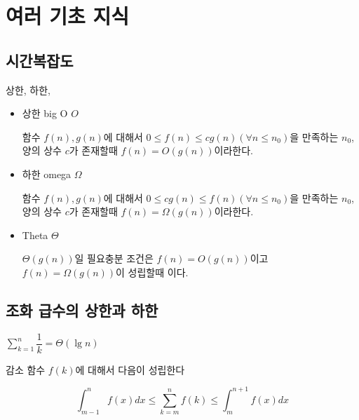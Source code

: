 
\section{여러 기초 지식}

\subsection{시간복잡도}

\begin{dfn}[복잡도]
    상한, 하한,  
    \begin{itemize}

        \item 상한 big O $O$
        
        함수 $f(n), g(n)$에 대해서 $0 \le f(n) \le cg(n) ( \forall n \leq n_0)$을 만족하는 $n_0$, 양의 상수 $c$가 존재할때 $f(n) = O(g(n))$이라한다.
        
        \item 하한 omega $\Omega$

        함수 $f(n), g(n)$에 대해서 $0 \le cg(n) \le f(n) ( \forall n \leq n_0)$을 만족하는 $n_0$, 양의 상수 $c$가 존재할때 $f(n) = \Omega(g(n))$이라한다.

        \item Theta $\Theta$

        $\Theta(g(n))$일 필요충분 조건은 $f(n) = O(g(n))$이고 $f(n) = \Omega(g(n))$이 성립할때 이다.
    \end{itemize}
\end{dfn}

\subsection{조화 급수의 상한과 하한}



$\sum_{k=1}^{n} \dfrac{1}{k} = \Theta(\lg n)$

감소 함수 $f(k)$에 대해서 다음이 성립한다

$$\int_{m-1}^{n}f(x)dx \le \sum_{k=m}^n f(k) \le \int_{m}^{n+1}f(x)dx$$


